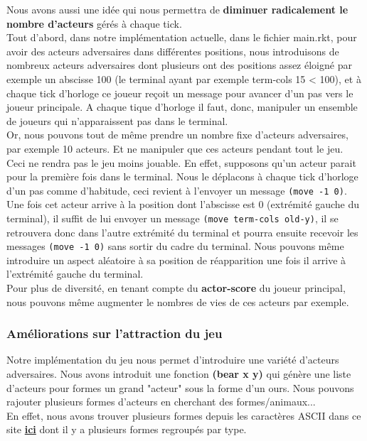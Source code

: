 \documentclass[a4paper]{article}
\begin{document}
Nous avons aussi une idée qui nous permettra de \textbf{diminuer radicalement le nombre d'acteurs} gérés à chaque tick.\\
Tout d'abord, dans notre implémentation actuelle, dans le fichier main.rkt, pour avoir des acteurs adversaires dans différentes positions, nous introduisons de nombreux acteurs adversaires dont plusieurs ont des positions assez éloigné par exemple un abscisse 100 (le terminal ayant par exemple term-cols 15 < 100), et à chaque tick d'horloge ce joueur reçoit un message pour avancer d'un pas vers le joueur principale. A chaque tique d'horloge il faut, donc, manipuler un ensemble de joueurs qui n'apparaissent pas dans le terminal.\\
Or, nous pouvons tout de même prendre un nombre fixe d'acteurs adversaires, par exemple 10 acteurs. Et ne manipuler que ces acteurs pendant tout le jeu. Ceci ne rendra pas le jeu moins jouable. En effet, supposons qu'un acteur parait pour la première fois dans le terminal. Nous le déplacons à chaque tick d'horloge d'un pas comme d'habitude, ceci revient à l'envoyer un message \texttt{(move -1 0)}. Une fois cet acteur arrive à la position dont l'abscisse est 0 (extrémité gauche du terminal), il suffit de lui envoyer un message \texttt{(move term-cols old-y)}, il se retrouvera donc dans l'autre extrémité du terminal et pourra ensuite recevoir les messages \texttt{(move -1 0)} sans sortir du cadre du terminal. Nous pouvons même introduire un aspect aléatoire à sa position de réapparition une fois il arrive à l'extrémité gauche du terminal.\\
Pour plus de diversité, en tenant compte du \textbf{actor-score} du joueur principal, nous pouvons même augmenter le nombres de vies de ces acteurs par exemple. 

\subsubsection{Améliorations sur l'attraction du jeu}
Notre implémentation du jeu nous permet d'introduire une variété d'acteurs adversaires. Nous avons introduit une fonction \textbf{(bear x y)} qui génère une liste d'acteurs pour formes un grand "acteur" sous la forme d'un ours. Nous pouvons rajouter plusieurs formes d'acteurs en cherchant des formes/animaux...\\
En effet, nous avons trouver plusieurs formes depuis les caractères ASCII dans ce site \href{https://asciiart.website/}{\textbf{ici}} dont il y a plusieurs formes regroupés par type. 
\end{document}
